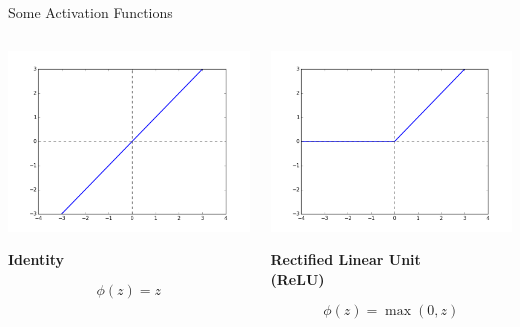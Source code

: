 \documentclass[handout,aspectratio=169]{beamer}
\begin{document}
\begin{frame}{Some Activation Functions}
  \begin{columns}
    \begin{column}{0.25 \linewidth}
      \includegraphics[width=\linewidth]{pics/act_lin.png}
      \begin{center}
        {\bf Identity}
      \end{center}
      \[ \phi(z) = z \]
    \end{column}

    \begin{column}{0.4 \linewidth}
    \centering
      \includegraphics[width=0.8\linewidth]{pics/act_relu.png}
      \begin{center}
        {\bf Rectified Linear Unit} \\
        {\bf (ReLU)}
      \end{center}
      \[ \phi(z) = \max(0, z) \]
    \end{column}


\end{columns}
\end{frame}
\end{document}
